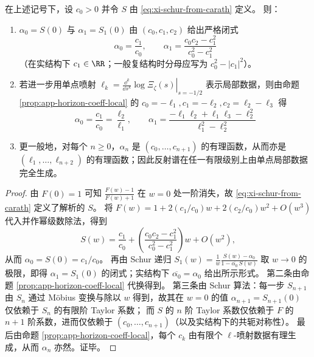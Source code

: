 \begin{theorem}\label{thm:xi-verblunsky-from-local-jet}
在上述记号下，设 \(c_0>0\) 并令 \(S\) 由 \eqref{eq:xi-schur-from-carath} 定义。
则：
\begin{enumerate}
  \item \(\alpha_0=S(0)\) 与 \(\alpha_1=S_1(0)\) 由 \((c_0,c_1,c_2)\) 给出严格闭式
  \[
  \boxed{\;
  \alpha_0=\frac{c_1}{c_0},\qquad
  \alpha_1=\frac{c_0c_2-c_1^2}{c_0^2-c_1^2}\;}
  \]
  （在实结构下 \(c_1\in\RR\)；一般复结构时分母应写为 \(c_0^2-|c_1|^2\)）。
  \item 若进一步用单点喷射
  \(
  \ell_k=\left.\frac{\dd^k}{\dd s^k}\log\Xi_\zeta(s)\right|_{s=-1/2}
  \)
  表示局部数据，则由命题 \ref{prop:app-horizon-coeff-local} 的 \(c_0=-\ell_1,c_1=-\ell_2,c_2=\ell_2-\ell_3\) 得
  \[
  \boxed{\;
  \alpha_0=\frac{c_1}{c_0}=\frac{\ell_2}{\ell_1},\qquad
  \alpha_1=\frac{-\ell_1\ell_2+\ell_1\ell_3-\ell_2^2}{\ell_1^2-\ell_2^2}\;}
  \]
  \item 更一般地，对每个 \(n\ge 0\)，\(\alpha_n\) 是 \((c_0,\dots,c_{n+1})\) 的有理函数，从而亦是 \((\ell_1,\dots,\ell_{n+2})\) 的有理函数；因此反射谱在任一有限级别上由单点局部数据完全生成。
\end{enumerate}
\end{theorem}

\begin{proof}
由 \(F(0)=1\) 可知 \(\frac{F(w)-1}{F(w)+1}\) 在 \(w=0\) 处一阶消失，故 \eqref{eq:xi-schur-from-carath} 定义了解析的 \(S\)。
将 \(F(w)=1+2(c_1/c_0)w+2(c_2/c_0)w^2+O(w^3)\) 代入并作幂级数除法，得到
\[
S(w)=\frac{c_1}{c_0}+\left(\frac{c_0c_2-c_1^2}{c_0^2-c_1^2}\right)w+O(w^2),
\]
从而 \(\alpha_0=S(0)=c_1/c_0\)。
再由 Schur 递归
\(
S_1(w)=\frac{1}{w}\frac{S(w)-\alpha_0}{1-\overline{\alpha_0}\,S(w)}
\)
取 \(w\to 0\) 的极限，即得 \(\alpha_1=S_1(0)\) 的闭式；实结构下 \(\overline{\alpha_0}=\alpha_0\) 给出所示形式。
第二条由命题 \ref{prop:app-horizon-coeff-local} 代换得到。
第三条由 Schur 算法：每一步 \(S_{n+1}\) 由 \(S_n\) 通过 Möbius 变换与除以 \(w\) 得到，故其在 \(w=0\) 的值 \(\alpha_{n+1}=S_{n+1}(0)\) 仅依赖于 \(S_n\) 的有限阶 Taylor 系数；
而 \(S\) 的 \(n\) 阶 Taylor 系数仅依赖于 \(F\) 的 \(n{+}1\) 阶系数，进而仅依赖于 \((c_0,\dots,c_{n+1})\)（以及实结构下的共轭对称性）。
最后由命题 \ref{prop:app-horizon-coeff-local}，每个 \(c_k\) 由有限个 \(\ell\)-喷射数据有理生成，从而 \(\alpha_n\) 亦然。证毕。
\end{proof}

